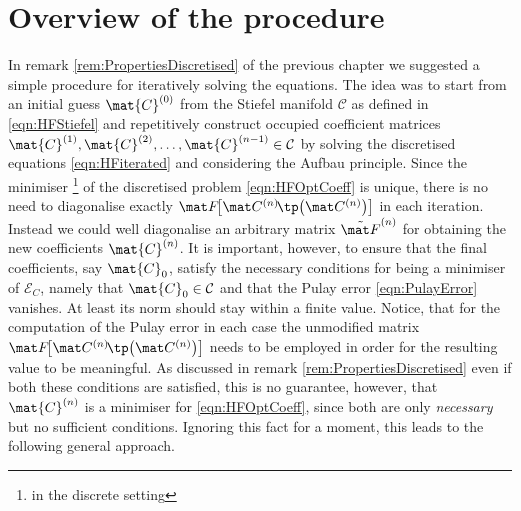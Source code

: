 \section{Overview of the \SCF procedure}
\label{sec:OverviewSCF}
In remark \ref{rem:PropertiesDiscretised}
of the previous chapter
we suggested a simple procedure for iteratively solving the \HF equations.
The idea was to start from an initial guess $\mat{C}^{(0)}$
from the Stiefel manifold $\mathcal{C}$ as defined in \eqref{eqn:HFStiefel}
and repetitively construct occupied coefficient
matrices $\mat{C}^{(1)}, \mat{C}^{(2)}, \ldots, \mat{C}^{(n-1)} \in \mathcal{C}$
by solving the discretised \HF equations \eqref{eqn:HFiterated}
and considering the Aufbau principle.
Since the minimiser%
\footnote{in the discrete setting}
of the discretised \HF problem \eqref{eqn:HFOptCoeff}
is unique, there is no need to diagonalise exactly $\matFnfull$ in each iteration.
Instead we could well diagonalise an arbitrary matrix $\matFnt$
for obtaining the new coefficients $\mat{C}^{(n)}$.
It is important, however, to ensure that the final coefficients,
say $\mat{C}_0$,
satisfy the necessary conditions for being a minimiser of $\mathcal{E}_C$,
namely that $\mat{C}_0 \in \mathcal{C}$ and that the Pulay error \eqref{eqn:PulayError} vanishes.
At least its norm should stay within a finite value.
Notice, that for the computation of the Pulay error
in each case the unmodified matrix $\matFnfull$ needs to be employed
in order for the resulting value to be meaningful.
As discussed in remark \vref{rem:PropertiesDiscretised}
even if both these conditions are satisfied,
this is no guarantee, however,
that $\mat{C}^{(n)}$ is a minimiser for \eqref{eqn:HFOptCoeff},
since both are only \emph{necessary} but no sufficient conditions.
Ignoring this fact for a moment, this leads to the following general approach.


